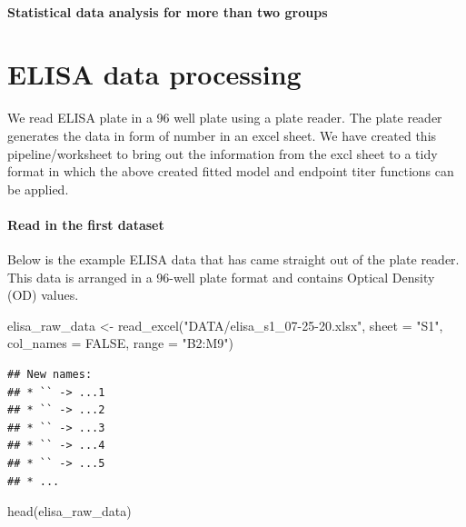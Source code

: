 \documentclass[
]{book}
\newenvironment{Shaded}{\begin{snugshade}}{\end{snugshade}}
\newcommand{\AttributeTok}[1]{\textcolor[rgb]{0.77,0.63,0.00}{#1}}
\newcommand{\ConstantTok}[1]{\textcolor[rgb]{0.00,0.00,0.00}{#1}}
\newcommand{\FunctionTok}[1]{\textcolor[rgb]{0.00,0.00,0.00}{#1}}
\newcommand{\NormalTok}[1]{#1}
\newcommand{\OtherTok}[1]{\textcolor[rgb]{0.56,0.35,0.01}{#1}}
\newcommand{\StringTok}[1]{\textcolor[rgb]{0.31,0.60,0.02}{#1}}
\begin{document}
\hypertarget{statistical-data-analysis-for-more-than-two-groups}{%
\subsubsection{Statistical data analysis for more than two groups}\label{statistical-data-analysis-for-more-than-two-groups}}

\hypertarget{elisa-data-processing}{%
\chapter{ELISA data processing}\label{elisa-data-processing}}

We read ELISA plate in a 96 well plate using a plate reader. The plate reader generates the data in form of number in an excel sheet. We have created this pipeline/worksheet to bring out the information from the excl sheet to a tidy format in which the above created fitted model and endpoint titer functions can be applied.

\hypertarget{read-in-the-first-dataset}{%
\subsubsection{Read in the first dataset}\label{read-in-the-first-dataset}}

Below is the example ELISA data that has came straight out of the plate reader. This data is arranged in a 96-well plate format and contains Optical Density (OD) values.

\begin{Shaded}
\begin{Highlighting}[]
\NormalTok{elisa\_raw\_data }\OtherTok{\textless{}{-}} \FunctionTok{read\_excel}\NormalTok{(}\StringTok{"DATA/elisa\_s1\_07{-}25{-}20.xlsx"}\NormalTok{, }
                             \AttributeTok{sheet =} \StringTok{"S1"}\NormalTok{, }\AttributeTok{col\_names =} \ConstantTok{FALSE}\NormalTok{,  }
                             \AttributeTok{range =} \StringTok{"B2:M9"}\NormalTok{)}
\end{Highlighting}
\end{Shaded}

\begin{verbatim}
## New names:
## * `` -> ...1
## * `` -> ...2
## * `` -> ...3
## * `` -> ...4
## * `` -> ...5
## * ...
\end{verbatim}

\begin{Shaded}
\begin{Highlighting}[]
\FunctionTok{head}\NormalTok{(elisa\_raw\_data)}
\end{Highlighting}
\end{Shaded}
\end{document}
